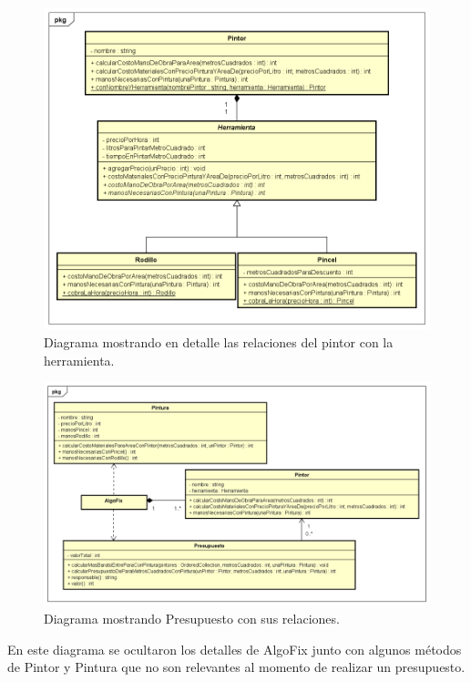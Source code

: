 \documentclass[titlepage,a4paper]{article}
\begin{document}
\begin{figure}[H]
\centering
\includegraphics[width=1\textwidth]{Pintor.png}
\caption{\label{fig:class02}Diagrama mostrando en detalle las relaciones del pintor con la herramienta.}
\end{figure}

\begin{figure}[H]
\centering
\includegraphics[width=1\textwidth]{Presupuesto.png}
\caption{\label{fig:class03}Diagrama mostrando Presupuesto con sus relaciones.}
\end{figure}
En este diagrama se ocultaron los detalles de AlgoFix junto con algunos métodos de Pintor y Pintura que no son relevantes al momento de realizar un presupuesto.



\end{document}
